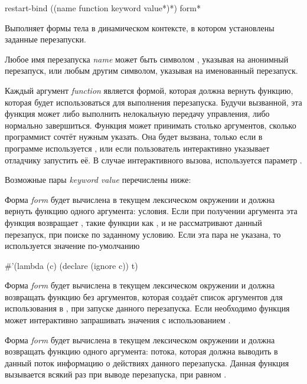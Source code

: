 \begin{defmac}
restart-bind ({(name function {keyword value}*)}*) {form}*

Выполняет формы тела в динамическом контексте, в котором установлены заданные
перезапуски.

Любое имя перезапуска \emph{name} может быть символом , указывая на
анонимный перезапуск, или любым другим символом, указывая на именованный
перезапуск.

Каждый аргумент \emph{function} является формой, которая должна вернуть функцию,
которая будет использоваться для выполнения перезапуска. Будучи вызванной, эта
функция может либо выполнить нелокальную передачу управления, либо нормально
завершиться. Функция может принимать столько аргументов, сколько программист
сочтёт нужным указать. Она будет вызвана, только если в программе используется
, или если пользователь интерактивно указывает отладчику
запустить её. В случае интерактивного вызова, используется параметр
.

Возможные пары \emph{keyword value} перечислены ниже:
\begin{flushdesc}

\item[\cd{:test-function \emph{form}}]
  Форма \emph{form} будет вычислена в текущем лексическом окружении и должна вернуть
  функцию одного аргумента: условия. Если при получении аргумента эта функция
  возвращает , такие функции как ,
   и  не рассматривают данный
  перезапуск, при поиске по заданному условию. Если эта пара не указана, то
  используется значение по-умолчанию
  \begin{lisp}
    \#'(lambda (c) (declare (ignore c)) t)
  \end{lisp}

\item[\cd{:interactive-function \emph{form}}]

  Форма \emph{form} будет вычислена в текущем лексическом окружении и должна
  возвращать функцию без аргументов, которая создаёт список аргументов для
  использования в , при запуске данного
  перезапуска. Если необходимо функция может интерактивно запрашивать значения с
  использованием .

\item[\cd{:report-function \emph{form}}]

  Форма \emph{form} будет вычислена в текущем лексическом окружении и должна
  возвращать функцию одного аргумента: потока, которая должна выводить в данный
  поток информацию о действиях данного перезапуска. Данная функция вызывается
  всякий раз при выводе перезапуска, при  равном .
\end{flushdesc}
\end{defmac}

